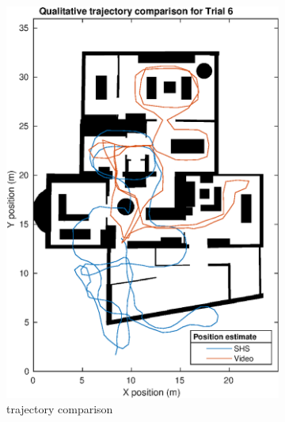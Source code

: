 \begin{figure}[H]
	\centering
	\begin{subfigure}[t]{.45\textwidth}
		\centering
		\includegraphics[width=0.85\linewidth]{images/20201201_2220_Qualitative_trajectory_comparison_for_Trial_6_1}
		\caption{trajectory comparison}
		\label{fig:trial6_on_map}
	\end{subfigure}
	\begin{subfigure}[t]{.45\textwidth}
		\centering

\end{subfigure}
\end{figure}

